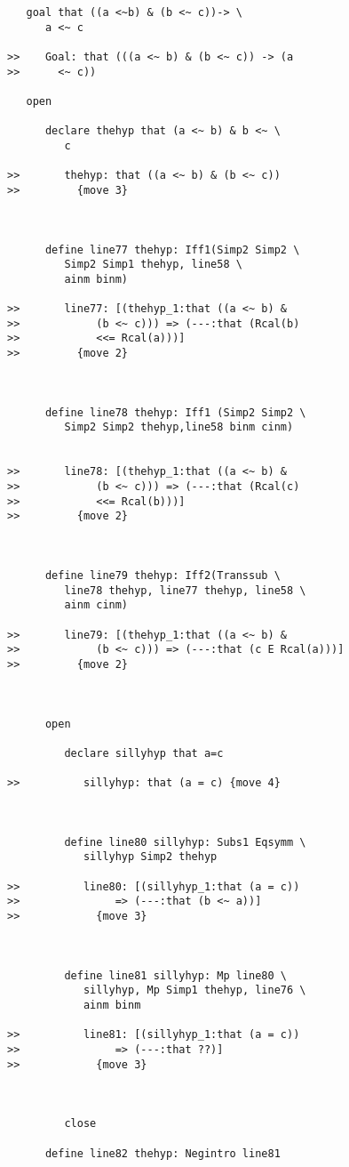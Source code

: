\documentclass[12pt]{article}
\begin{document}
\begin{verbatim}
   goal that ((a <~b) & (b <~ c))-> \
      a <~ c

>>    Goal: that (((a <~ b) & (b <~ c)) -> (a
>>      <~ c))

   open

      declare thehyp that (a <~ b) & b <~ \
         c

>>       thehyp: that ((a <~ b) & (b <~ c))
>>         {move 3}



      define line77 thehyp: Iff1(Simp2 Simp2 \
         Simp2 Simp1 thehyp, line58 \
         ainm binm)

>>       line77: [(thehyp_1:that ((a <~ b) &
>>            (b <~ c))) => (---:that (Rcal(b)
>>            <<= Rcal(a)))]
>>         {move 2}



      define line78 thehyp: Iff1 (Simp2 Simp2 \
         Simp2 Simp2 thehyp,line58 binm cinm)


>>       line78: [(thehyp_1:that ((a <~ b) &
>>            (b <~ c))) => (---:that (Rcal(c)
>>            <<= Rcal(b)))]
>>         {move 2}



      define line79 thehyp: Iff2(Transsub \
         line78 thehyp, line77 thehyp, line58 \
         ainm cinm)

>>       line79: [(thehyp_1:that ((a <~ b) &
>>            (b <~ c))) => (---:that (c E Rcal(a)))]
>>         {move 2}



      open

         declare sillyhyp that a=c

>>          sillyhyp: that (a = c) {move 4}



         define line80 sillyhyp: Subs1 Eqsymm \
            sillyhyp Simp2 thehyp

>>          line80: [(sillyhyp_1:that (a = c))
>>               => (---:that (b <~ a))]
>>            {move 3}



         define line81 sillyhyp: Mp line80 \
            sillyhyp, Mp Simp1 thehyp, line76 \
            ainm binm

>>          line81: [(sillyhyp_1:that (a = c))
>>               => (---:that ??)]
>>            {move 3}



         close

      define line82 thehyp: Negintro line81



\end{verbatim}
\end{document}
